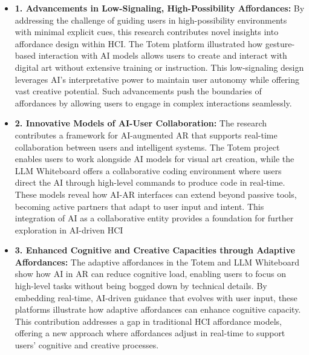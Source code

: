 \begin{itemize}
    \item \textbf{1. Advancements in Low-Signaling, High-Possibility Affordances:} By addressing the challenge of guiding users in high-possibility environments with minimal explicit cues, this research contributes novel insights into affordance design within HCI.
    The Totem platform illustrated how gesture-based interaction with AI models allows users to create and interact with digital art without extensive training or instruction. %
    This low-signaling design leverages AI’s interpretative power to maintain user autonomy while offering vast creative potential.
    Such advancements push the boundaries of affordances by allowing users to engage in complex interactions seamlessly.%

    \item  \textbf{2. Innovative Models of AI-User Collaboration:} The research contributes a framework for AI-augmented AR that supports real-time collaboration between users and intelligent systems.
    The Totem project enables users to work alongside AI models for visual art creation, while the LLM Whiteboard offers a collaborative coding environment where users direct the AI through high-level commands to produce code in real-time.
    These models reveal how AI-AR interfaces can extend beyond passive tools, becoming active partners that adapt to user input and intent.
    This integration of AI as a collaborative entity provides a foundation for further exploration in AI-driven HCI%
    
    \item \textbf{3. Enhanced Cognitive and Creative Capacities through Adaptive Affordances:} The adaptive affordances in the Totem and LLM Whiteboard show how AI in AR can reduce cognitive load, enabling users to focus on high-level tasks without being bogged down by technical details.
    By embedding real-time, AI-driven guidance that evolves with user input, these platforms illustrate how adaptive affordances can enhance cognitive capacity.
    This contribution addresses a gap in traditional HCI affordance models, offering a new approach where affordances adjust in real-time to support users’ cognitive and creative processes.

\end{itemize}

